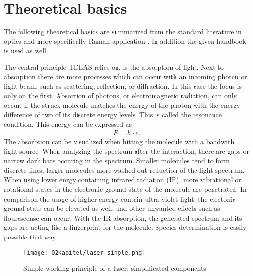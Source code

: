 
\chapter{Theoretical basics}
\label{chap:theoretical}

The following theoretical basics are summarized from the standard literature in optics \autocite{bornPrinciplesOpticsElectromagnetic1999,hechtOptik2005,lipsonOptik1997,niedrigOptikWellenUnd2004} and more specifically Raman application \autocite{herzbergMolecularSpectraMolecular2013,schraderInfraredRamanSpectroscopy1995}. In addition the given handbook \autocite{klevanskyTDLASTunableLaser2021} is used as well.

The central principle TDLAS relies on, is the absorption of light. Next to absorption there are more processes which can occur with an incoming photon or light beam, such as scattering, reflection, or diffraction. In this case the focus is only on the first. Absortion of photons, or electromagnetic radiation, can only occur, if the struck molecule matches the energy of the photon with the energy difference of two of its discrete energy levels. This is called the resonance condition. This energy can be expressed as
\begin{align}
    E=h \cdot v \nonumber .
\end{align}
The absorbtion can be visualized when hitting the molecule with a bandwith light source. When analyzing the spectrum after the interaction, there are gaps or narrow dark bars occuring in the spectrum. Smaller molecules tend to form discrete lines, larger molecules more washed out reduction of the light spectrum. When using lower enrgy containing infrared radiation (IR), more vibrational or rotational states in the electronic ground state of the molecule are penetrated. In comparison the usage of higher energy contain ultra violet light, the electonic ground state can be elevated as well, and other unwanted effects such as flourescense can occur. With the IR absorption, the generated spectrum and its gaps are acting like a fingerprint for the molecule. Species determination is easily possible that way.


\begin{figure}[!htb]
    \centering
    \texttt{[image: 02kapitel/laser-simple.png]}
    \caption[Components and working pronciples of a laser]{Simple working principle of a laser; simplificated components \autocite{klevanskyTDLASTunableLaser2021}}
    \label{fig:laser-simple}
\end{figure}

